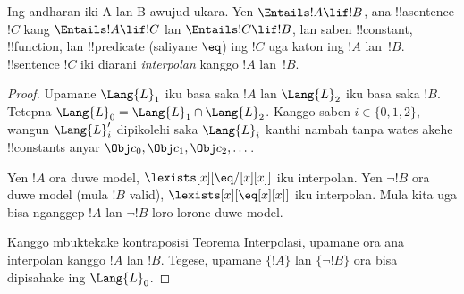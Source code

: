 \documentclass[../../../include/open-logic-section]{subfiles}
\begin{document}


\begin{thm}
Ing andharan iki A lan B awujud ukara.
Yen $\Entails !A \lif !B$, ana !!a{sentence} $!C$ kang
$\Entails !A \lif !C$ lan $\Entails !C \lif !B$, lan saben
!!{constant}, !!{function}, lan !!{predicate} (saliyane $\eq$) ing
$!C$ uga katon ing $!A$ lan~$!B$. !!{sentence} $!C$ iki diarani
\emph{interpolan} kanggo $!A$ lan~$!B$.
\end{thm}

\begin{proof}
Upamane $\Lang{L}_1$ iku basa saka $!A$ lan $\Lang{L}_2$ iku
basa saka $!B$. Tetepna $\Lang{L}_0 = \Lang{L}_1 \cap \Lang{L}_2$.
Kanggo saben $i \in \{0, 1, 2 \}$, wangun $\Lang{L}'_i$ dipikolehi
saka $\Lang{L}_i$ kanthi nambah tanpa wates akehe !!{constant}s anyar
$\Obj c_0, \Obj c_1, \Obj c_2, \dots$.

Yen $!A$ ora duwe model, $\lexists[x][\eq/[x][x]]$ iku
interpolan. Yen $\lnot !B$ ora duwe model (mula $!B$ valid),
$\lexists[x][\eq[x][x]]$ iku interpolan. Mula kita uga bisa
nganggep $!A$ lan $\lnot !B$ loro-lorone duwe model.

Kanggo mbuktekake kontraposisi Teorema Interpolasi,
upamane ora ana interpolan kanggo $!A$ lan $!B$.
Tegese, upamane $\{!A\}$ lan $\{\lnot !B\}$ ora bisa dipisahake
ing $\Lang{L}_0$.


\end{proof}
\end{document}
